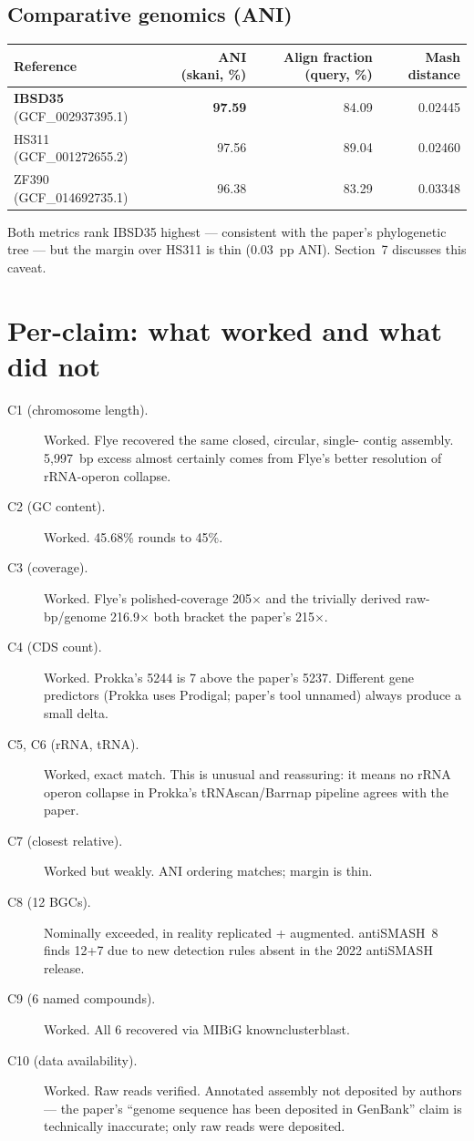 \documentclass[11pt,a4paper]{article}
\begin{document}
\subsection{Comparative genomics (ANI)}

\begin{tabular}{@{}l r r r@{}}
\toprule
Reference & ANI (skani, \%) & Align fraction (query, \%) & Mash distance \\
\midrule
\textbf{IBSD35} (GCF\_002937395.1) & \textbf{97.59} & 84.09 & 0.02445 \\
HS311  (GCF\_001272655.2) & 97.56 & 89.04 & 0.02460 \\
ZF390  (GCF\_014692735.1) & 96.38 & 83.29 & 0.03348 \\
\bottomrule
\end{tabular}

Both metrics rank IBSD35 highest --- consistent with the paper's phylogenetic tree --- but
the margin over HS311 is thin (0.03~pp ANI). Section~7 discusses this caveat.

\section{Per-claim: what worked and what did not}

\begin{description}
\item[C1 (chromosome length).] Worked. Flye recovered the same closed, circular, single-
      contig assembly. 5{,}997~bp excess almost certainly comes from Flye's better resolution
      of rRNA-operon collapse.
\item[C2 (GC content).] Worked. 45.68\% rounds to 45\%.
\item[C3 (coverage).] Worked. Flye's polished-coverage 205${\times}$ and the trivially derived
      raw-bp/genome 216.9${\times}$ both bracket the paper's 215${\times}$.
\item[C4 (CDS count).] Worked. Prokka's 5244 is 7 above the paper's 5237. Different gene
      predictors (Prokka uses Prodigal; paper's tool unnamed) always produce a small delta.
\item[C5, C6 (rRNA, tRNA).] Worked, exact match. This is unusual and reassuring: it means
      no rRNA operon collapse in Prokka's tRNAscan/Barrnap pipeline agrees with the paper.
\item[C7 (closest relative).] Worked but weakly. ANI ordering matches; margin is thin.
\item[C8 (12 BGCs).] Nominally exceeded, in reality replicated + augmented. antiSMASH~8
      finds 12+7 due to new detection rules absent in the 2022 antiSMASH release.
\item[C9 (6 named compounds).] Worked. All 6 recovered via MIBiG knownclusterblast.
\item[C10 (data availability).] Worked. Raw reads verified. Annotated assembly not deposited
      by authors --- the paper's ``genome sequence has been deposited in GenBank'' claim is
      technically inaccurate; only raw reads were deposited.
\end{description}
\end{document}
